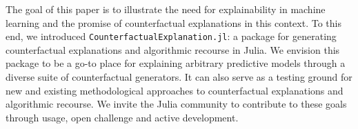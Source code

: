 \documentclass{juliacon}
\begin{document}
The goal of this paper is to illustrate the need for explainability in
machine learning and the promise of counterfactual explanations in this
context. To this end, we introduced
\texttt{CounterfactualExplanation.jl}: a package for generating
counterfactual explanations and algorithmic recourse in Julia. We
envision this package to be a go-to place for explaining arbitrary
predictive models through a diverse suite of counterfactual generators.
It can also serve as a testing ground for new and existing
methodological approaches to counterfactual explanations and algorithmic
recourse. We invite the Julia community to contribute to these goals
through usage, open challenge and active development.


\end{document}
